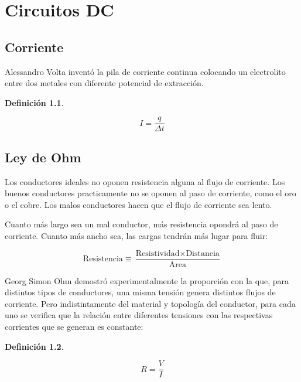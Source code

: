 \documentclass[a5paper,12pt,twoside]{book}
\newtheorem{defn}{{Definición}}[chapter]
\begin{document}
\chapter{Circuitos DC}
\renewcommand{\voltage}{V}
\renewcommand{\current}{I}

\section{Corriente}

Alessandro Volta inventó la pila de corriente continua colocando un electrolito entre dos metales con diferente potencial de extracción.

\begin{mdframed}[style=MyFrame1]
    \begin{defn}
    \end{defn}
    \begin{equation*}
        I = \frac{q}{\Delta t}
    \end{equation*}
\end{mdframed}


\section{Ley de Ohm}

Los conductores ideales no oponen resistencia alguna al flujo de corriente.
Los buenos conductores practicamente no se oponen al paso de corriente, como el oro o el cobre.
Los malos conductores hacen que el flujo de corriente sea lento.

Cuanto más largo sea un mal conductor, más resistencia opondrá al paso de corriente.
Cuanto más ancho sea, las cargas tendrán más lugar para fluir:

\begin{equation*}
    \text{Resistencia} \equiv \frac{\text{Resistividad} \times \text{Distancia}}{\text{Area}}
\end{equation*}

Georg Simon Ohm demostró experimentalmente la proporción con la que, para distintos tipos de conductores, una misma tensión genera distintos flujos de corriente.
Pero indistintamente del material y topología del conductor, para cada uno se verifica que la relación entre diferentes tensiones con las respectivas corrientes que se generan es constante:

\begin{mdframed}[style=MyFrame1]
    \begin{defn}
    \end{defn}
    \begin{equation*}
        R = \frac{V}{I}
    \end{equation*}
\end{mdframed}
\end{document}
